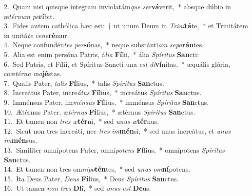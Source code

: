 {2.~}Quam nisi quisque íntegram inviolatám\textit{que} \textit{ser}\textbf{vá}verit,~* absque dúbio in æ\textit{tér}\textit{num} \textit{pe}\textbf{rí}bit.\\
{3.~}Fides autem cathólica hæc est:~† ut unum Deum in \textit{Tri}\textit{ni}\textbf{tá}te,~* et Trinitátem in unitá\textit{te} \textit{ve}\textit{ne}\textbf{ré}mur.\\
{4.~}Neque confundén\textit{tes} \textit{per}\textbf{só}nas,~* neque substánti\textit{am} \textit{se}\textit{pa}\textbf{rán}tes.\\
{5.~}Alia est enim persóna Patris, á\textit{li}\textit{a} \textbf{Fí}lii,~* ália \textit{Spí}\textit{ri}\textit{tus} \textbf{San}cti:\\
{6.~}Sed Patris, et Fílii, et Spíritus Sancti una \textit{est} \textit{di}\textbf{ví}nitas,~* æquális glória, coæ\textit{tér}\textit{na} \textit{ma}\textbf{jé}stas.\\
{7.~}Qualis Pater, \textit{ta}\textit{lis} \textbf{Fí}lius,~* talis \textit{Spí}\textit{ri}\textit{tus} \textbf{San}ctus.\\
{8.~}Increátus Pater, incre\textit{á}\textit{tus} \textbf{Fí}lius,~* increátus \textit{Spí}\textit{ri}\textit{tus} \textbf{San}ctus.\\
{9.~}Imménsus Pater, im\textit{mén}\textit{sus} \textbf{Fí}lius,~* imménsus \textit{Spí}\textit{ri}\textit{tus} \textbf{San}ctus.\\
{10.~}Ætérnus Pater, æ\textit{tér}\textit{nus} \textbf{Fí}lius,~* ætérnus \textit{Spí}\textit{ri}\textit{tus} \textbf{San}ctus.\\
{11.~}Et tamen non \textit{tres} \textit{æ}\textbf{tér}ni,~* sed \textit{u}\textit{nus} \textit{æ}\textbf{tér}nus.\\
{12.~}Sicut non tres increáti, nec \textit{tres} \textit{im}\textbf{mén}si,~* sed unus increátus, et \textit{u}\textit{nus} \textit{im}\textbf{mén}sus.\\
{13.~}Simíliter omnípotens Pater, omní\textit{po}\textit{tens} \textbf{Fí}lius,~* omnípotens \textit{Spí}\textit{ri}\textit{tus} \textbf{San}ctus.\\
{14.~}Et tamen non tres om\textit{ni}\textit{po}\textbf{tén}tes,~* sed \textit{u}\textit{nus} \textit{om}\textbf{ní}potens.\\
{15.~}Ita Deus Pater, \textit{De}\textit{us} \textbf{Fí}lius,~* Deus \textit{Spí}\textit{ri}\textit{tus} \textbf{San}ctus.\\
{16.~}Ut tamen \textit{non} \textit{tres} \textbf{Di}i,~* sed \textit{u}\textit{nus} \textit{est} \textbf{De}us.\\
